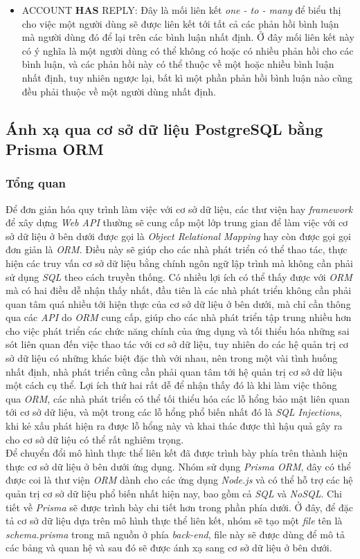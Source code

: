 \begin{itemize}
    \item ACCOUNT \textbf{HAS} REPLY: Đây là mối liên kết \textit{one - to - many} để biểu thị cho việc một người dùng sẽ được liên kết tới tất cả các phản hồi bình luận mà người dùng đó để lại trên các bình luận nhất định. Ở đây mối liên kết này có ý nghĩa là một người dùng có thể không có hoặc có nhiều phản hồi cho các bình luận, và các phản hồi này có thể thuộc về một hoặc nhiều bình luận nhất định, tuy nhiên ngược lại, bất kì một phần phản hồi bình luận nào cũng đều phải thuộc về một người dùng nhất định.
\end{itemize}
\subsection{Ánh xạ qua cơ sở dữ liệu PostgreSQL bằng Prisma ORM}
\subsubsection{Tổng quan}
\hspace*{1cm}
Để đơn giản hóa quy trình làm việc với cơ sở dữ liệu, các thư viện hay \textit{framework} để xây dựng \textit{Web API} thường sẽ cung cấp một lớp trung gian để làm việc với cơ sở dữ liệu ở bên dưới được gọi là \textit{Object Relational Mapping} hay còn được gọi gọi đơn giản là \textit{ORM}. Điều này sẽ giúp cho các nhà phát triển có thể thao tác, thực hiện các truy vấn cơ sở dữ liệu bằng chính ngôn ngữ lập trình mà không cần phải sử dụng \textit{SQL} theo cách truyền thống. Có nhiều lợi ích có thể thấy được với \textit{ORM} mà có hai điều dễ nhận thấy nhất, đầu tiên là các nhà phát triển không cần phải quan tâm quá nhiều tới hiện thực của cơ sở dữ liệu ở bên dưới, mà chỉ cần thông qua các \textit{API} do \textit{ORM} cung cấp, giúp cho các nhà phát triển tập trung nhiều hơn cho việc phát triển các chức năng chính của ứng dụng và tối thiểu hóa những sai sót liên quan đến việc thao tác với cơ sở dữ liệu, tuy nhiên do các hệ quản trị cơ sở dữ liệu có những khác biệt đặc thù với nhau, nên trong một vài tình huống nhất định, nhà phát triển cũng cần phải quan tâm tới hệ quản trị cơ sở dữ liệu một cách cụ thể. Lợi ích thứ hai rất dễ để nhận thấy đó là khi làm việc thông qua \textit{ORM}, các nhà phát triển có thể tối thiểu hóa các lỗ hổng bảo mật liên quan tới cơ sở dữ liệu, và một trong các lỗ hổng phổ biến nhất đó là \textit{SQL Injections}, khi kẻ xấu phát hiện ra được lỗ hổng này và khai thác được thì hậu quả gây ra cho cơ sở dữ liệu có thể rất nghiêm trọng.\\
\hspace*{1cm}
Để chuyển đổi mô hình thực thể liên kết đã được trình bày phía trên thành hiện thực cơ sở dữ liệu ở bên dưới ứng dụng. Nhóm sử dụng \textit{Prisma ORM}, đây có thể được coi là thư viện \textit{ORM} dành cho các ứng dụng \textit{Node.js} và có thể hỗ trợ các hệ quản trị cơ sở dữ liệu phổ biến nhất hiện nay, bao gồm cả \textit{SQL} và \textit{NoSQL}. Chi tiết về \textit{Prisma} sẽ được trình bày chi tiết hơn trong phần phía dưới. Ở đây, để đặc tả cơ sở dữ liệu dựa trên mô hình thực thể liên kết, nhóm sẽ tạo một \textit{file} tên là \textit{schema.prisma} trong mã nguồn ở phía \textit{back-end}, file này sẽ được dùng để mô tả các bảng và quan hệ và sau đó sẽ được ánh xạ sang cơ sở dữ liệu ở bên dưới.

